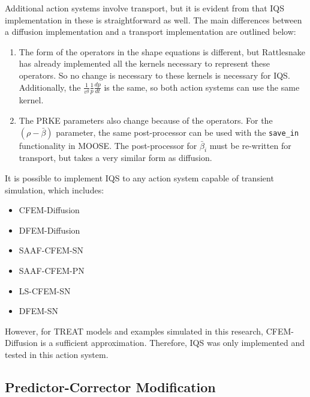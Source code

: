 Additional action systems involve transport, but it is evident from  that IQS implementation in these is straightforward as well.  The main differences between a diffusion implementation and a transport implementation are outlined below:

\begin{enumerate}
\item The form of the operators in the shape equations is different, but Rattlesnake has already implemented all the kernels necessary to represent these operators.  So no change is necessary to these kernels is necessary for IQS.  Additionally, the $\frac{1}{v^g}\frac{1}{p}\frac{dp}{dt}$ is the same, so both action systems can use the same kernel.
\item The PRKE parameters also change because of the operators.  For the $(\rho-\bar{\beta})$ parameter, the same post-processor can be used with the \texttt{save\_in} functionality in MOOSE.  The post-processor for $\bar{\beta}_i$ must be re-written for transport, but takes a very similar form as diffusion.
\end{enumerate}

It is possible to implement IQS to any action system capable of transient simulation, which includes:
\begin{itemize}
\item CFEM-Diffusion
\item DFEM-Diffusion
\item SAAF-CFEM-SN
\item SAAF-CFEM-PN
\item LS-CFEM-SN
\item DFEM-SN
\end{itemize}
However, for TREAT models and examples simulated in this research, CFEM-Diffusion is a sufficient approximation. Therefore, IQS was only implemented and tested in this action system.

\subsection{Predictor-Corrector Modification}

